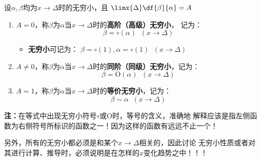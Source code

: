 \begin{thx}
	设$\alpha,\beta$均为$x\to\Delta$时的无穷小，且
	$\limx{\Delta}\df{\beta}{\alpha}=A$
	\begin{enumerate}[(1)]
	  \item $A=0$，称$\beta$为$\alpha$当$x\to\Delta$时的{\bf 高阶（高级）无穷小}，
	  记为：
	  $$\beta=\circ(\alpha)\;\;(x\to\Delta)$$
	  \begin{itemize}
	    \item {\bf 无穷小}可记为：
	    $\beta=\circ(1),\alpha=\circ(1)\;\;(x\to\Delta)$
	  \end{itemize}
	  \item $A\ne 0$，称$\beta$为$\alpha$当$x\to\Delta$时的{\bf 同阶（同级）无穷小}，记为：
	  $$\beta=\mathrm{O}(\alpha)\;\;(x\to\Delta)$$
	  \item $A=1$，称$\beta$为$\alpha$当$x\to\Delta$时的{\bf 等价无穷小}，记为：
	  $$\beta\sim \alpha\;\;(x\to\Delta)$$
	\end{enumerate}
\end{thx}
{\bf 注：}在等式中出现无穷小符号$\circ$或$\mathrm{O}$时，等号的含义，准确地
解释应该是指左侧函数为右侧符号所标识的函数之一！因为这样的函数有远远不止一个！

另外，所有的无穷小都必须是和某个$x\to\Delta$相关的，因此讨论
无穷小性质或者对其进行计算、推导时，必须说明是在怎样的$x$变化趋势之中！！！

